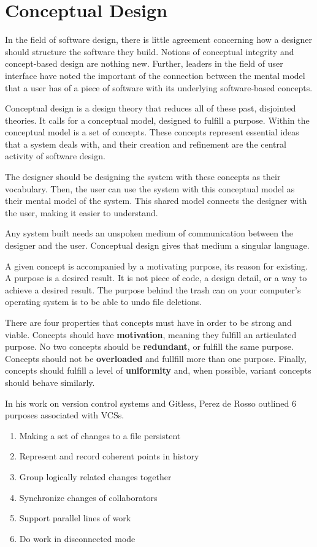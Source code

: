 \section{Conceptual Design}

In the field of software design, there is little agreement concerning how a designer should structure the software they build. Notions of conceptual integrity and concept-based design are nothing new. Further, leaders in the field of user interface have noted the important of the connection between the mental model that a user has of a piece of software with its underlying software-based concepts. 

Conceptual design is a design theory that reduces all of these past, disjointed theories. It calls for a conceptual model, designed to fulfill a purpose. Within the conceptual model is a set of concepts. These concepts represent essential ideas that a system deals with, and their creation and refinement are the central activity of software design.

The designer should be designing the system with these concepts as their vocabulary. Then, the user can use the system with this conceptual model as their mental model of the system. This shared model connects the designer with the user, making it easier to understand.

Any system built needs an unspoken medium of communication between the designer and the user. Conceptual design gives that medium a singular language.

A given concept is accompanied by a motivating purpose, its reason for existing. A purpose is a desired result. It is not piece of code, a design detail, or a way to achieve a desired result. The purpose behind the trash can on your computer's operating system is to be able to undo file deletions.

There are four properties that concepts must have in order to be strong and viable. Concepts should have \textbf{motivation}, meaning they fulfill an articulated purpose. No two concepts should be \textbf{redundant}, or fulfill the same purpose. Concepts should not be \textbf{overloaded} and fullfill more than one purpose. Finally, concepts should fulfill a level of \textbf{uniformity} and, when possible, variant concepts should behave similarly.

In his work on version control systems and Gitless, Perez de Rosso outlined 6 purposes associated with VCSs.\begin{enumerate}
  \item{Making a set of changes to a file persistent}
  \item{Represent and record coherent points in history}
  \item{Group logically related changes together}
  \item{Synchronize changes of collaborators}
  \item{Support parallel lines of work}
  \item{Do work in disconnected mode}
\end{enumerate}

